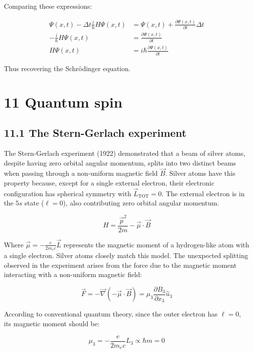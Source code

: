 \documentclass[10pt]{article}
\begin{document}
Comparing these expressions:

\begin{align*}
\Psi(x, t)-\Delta t \frac{i}{\hbar} H \Psi(x, t) & =\Psi(x, t)+\frac{\partial \Psi(x, t)}{\partial t} \Delta t \\
-\frac{i}{\hbar} H \Psi(x, t) & =\frac{\partial \Psi(x, t)}{\partial t}  \tag{10.61}\\
H \Psi(x, t) & =i \hbar \frac{\partial \Psi(x, t)}{\partial t}
\end{align*}

Thus recovering the Schrödinger equation.

\section*{11 Quantum spin}
\subsection*{11.1 The Stern-Gerlach experiment}
The Stern-Gerlach experiment (1922) demonstrated that a beam of silver atoms, despite having zero orbital angular momentum, splits into two distinct beams when passing through a non-uniform magnetic field $\vec{B}$. Silver atoms have this property because, except for a single external electron, their electronic configuration has spherical symmetry with $\vec{L}_{\text{TOT}}=0$. The external electron is in the $5s$ state ($\ell=0$), also contributing zero orbital angular momentum.


\begin{equation*}
H=\frac{\vec{p}^{2}}{2 m}-\vec{\mu} \cdot \vec{B} \tag{11.1}
\end{equation*}

Where $\vec{\mu}=-\frac{e}{2 m_{e} c} \vec{L}$ represents the magnetic moment of a hydrogen-like atom with a single electron. Silver atoms closely match this model. The unexpected splitting observed in the experiment arises from the force due to the magnetic moment interacting with a non-uniform magnetic field:

\begin{equation*}
\vec{F}=-\vec{\nabla}(-\vec{\mu} \cdot \vec{B})=\mu_{3} \frac{\partial B_{3}}{\partial x_{3}} \hat{u}_{3} \tag{11.2}
\end{equation*}

According to conventional quantum theory, since the outer electron has $\ell=0$, its magnetic moment should be:

\begin{equation*}
\mu_{3}=-\frac{e}{2 m_{e} c} L_{3} \propto \hbar m=0 \tag{11.3}
\end{equation*}
\end{document}
